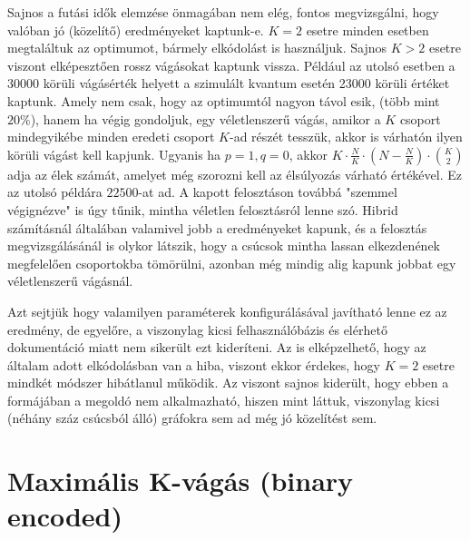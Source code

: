 Sajnos a futási idők elemzése önmagában nem elég, fontos megvizsgálni, hogy valóban jó (közelítő) eredményeket kaptunk-e. $K=2$ esetre minden esetben megtaláltuk az optimumot, bármely elkódolást is használjuk.
Sajnos $K>2$ esetre viszont elképesztően rossz vágásokat kaptunk vissza. Például az utolsó esetben a 30000 körüli vágásérték helyett a szimulált kvantum esetén 23000 körüli értéket kaptunk. Amely nem csak, hogy az optimumtól nagyon távol esik, (több mint $20\%$), hanem ha végig gondoljuk, egy véletlenszerű vágás, amikor a $K$ csoport mindegyikébe minden eredeti csoport $K$-ad részét tesszük, akkor is várhatón ilyen körüli vágást kell kapjunk. Ugyanis ha $p=1, q=0$, akkor $K \cdot \frac{N}{K} \cdot (N-\frac{N}{K}) \cdot \binom{K}{2}$ adja az élek számát, amelyet még szorozni kell az élsúlyozás várható értékével. Ez az utolsó példára $22500$-at ad. A kapott felosztáson továbbá "szemmel végignézve" is úgy tűnik, mintha véletlen felosztásról lenne szó.
Hibrid számításnál általában valamivel jobb a eredményeket kapunk, és a felosztás megvizsgálásánál is olykor látszik, hogy a csúcsok mintha lassan elkezdenének megfelelően csoportokba tömörülni, azonban még mindig alig kapunk jobbat egy véletlenszerű vágásnál.

Azt sejtjük hogy valamilyen paraméterek konfigurálásával javítható lenne ez az eredmény, de egyelőre, a viszonylag kicsi felhasználóbázis és elérhető dokumentáció miatt nem sikerült ezt kideríteni. Az is elképzelhető, hogy az általam adott elkódolásban van a hiba, viszont ekkor érdekes, hogy $K=2$ esetre mindkét módszer hibátlanul működik.  Az viszont sajnos kiderült, hogy ebben a formájában a megoldó nem alkalmazható, hiszen mint láttuk, viszonylag kicsi (néhány száz csúcsból álló) gráfokra sem ad még jó közelítést sem.

\section{Maximális K-vágás (binary encoded)}


